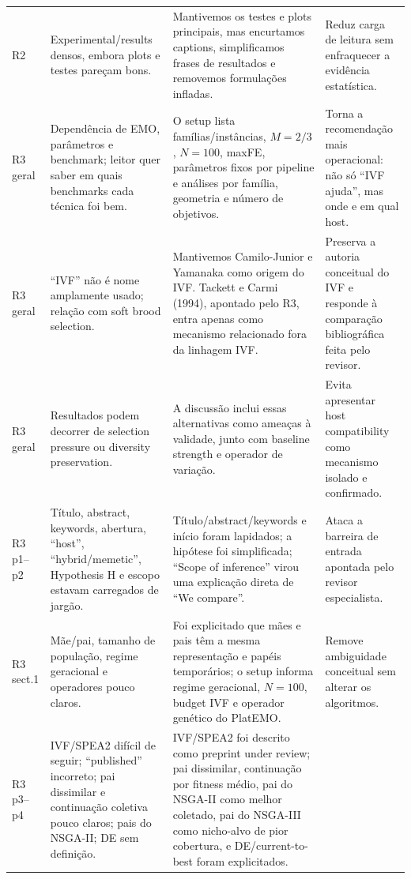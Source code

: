 \documentclass[10pt]{article}
\begin{document}
\begin{longtable}{@{}L{1.35cm}L{4.25cm}L{6.35cm}L{4.25cm}@{}}
\addlinespace
R2 &
Experimental/results densos, embora plots e testes pare\c{c}am bons. &
Mantivemos os testes e plots principais, mas encurtamos captions, simplificamos frases de resultados e removemos formula\c{c}\~oes infladas. &
Reduz carga de leitura sem enfraquecer a evid\^encia estat\'istica. \\
\addlinespace
R3 geral &
Depend\^encia de EMO, par\^ametros e benchmark; leitor quer saber em quais benchmarks cada t\'ecnica foi bem. &
O setup lista fam\'ilias/inst\^ancias, $M=2/3$, $N=100$, maxFE, par\^ametros fixos por pipeline e an\'alises por fam\'ilia, geometria e n\'umero de objetivos. &
Torna a recomenda\c{c}\~ao mais operacional: n\~ao s\'o ``IVF ajuda'', mas onde e em qual host. \\
\addlinespace
R3 geral &
``IVF'' n\~ao \'e nome amplamente usado; rela\c{c}\~ao com soft brood selection. &
Mantivemos Camilo-Junior e Yamanaka como origem do IVF. Tackett e Carmi (1994), apontado pelo R3, entra apenas como mecanismo relacionado fora da linhagem IVF. &
Preserva a autoria conceitual do IVF e responde \`a compara\c{c}\~ao bibliogr\'afica feita pelo revisor. \\
\addlinespace
R3 geral &
Resultados podem decorrer de selection pressure ou diversity preservation. &
A discuss\~ao inclui essas alternativas como amea\c{c}as \`a validade, junto com baseline strength e operador de varia\c{c}\~ao. &
Evita apresentar host compatibility como mecanismo isolado e confirmado. \\
\addlinespace
R3 p1--p2 &
T\'itulo, abstract, keywords, abertura, ``host'', ``hybrid/memetic'', Hypothesis H e escopo estavam carregados de jarg\~ao. &
T\'itulo/abstract/keywords e in\'icio foram lapidados; a hip\'otese foi simplificada; ``Scope of inference'' virou uma explica\c{c}\~ao direta de ``We compare''. &
Ataca a barreira de entrada apontada pelo revisor especialista. \\
\addlinespace
R3 sect.1 &
M\~ae/pai, tamanho de popula\c{c}\~ao, regime geracional e operadores pouco claros. &
Foi explicitado que m\~aes e pais t\^em a mesma representa\c{c}\~ao e pap\'eis tempor\'arios; o setup informa regime geracional, $N=100$, budget IVF e operador gen\'etico do PlatEMO. &
Remove ambiguidade conceitual sem alterar os algoritmos. \\
\addlinespace
R3 p3--p4 &
IVF/SPEA2 dif\'icil de seguir; ``published'' incorreto; pai dissimilar e continua\c{c}\~ao coletiva pouco claros; pais do NSGA-II; DE sem defini\c{c}\~ao. &
IVF/SPEA2 foi descrito como preprint under review; pai dissimilar, continua\c{c}\~ao por fitness m\'edio, pai do NSGA-II como melhor coletado, pai do NSGA-III como nicho-alvo de pior cobertura, e DE/current-to-best foram explicitados. &

\end{longtable}
\end{document}
